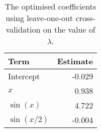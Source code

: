 \begin{table}[!h]

\caption{\label{tab:lasso-coefs}The optimised coefficients using leave-one-out cross-validation on the value of \(\lambda\).}
\centering
\begin{tabular}{lr}
\toprule
Term & Estimate\\
\midrule
Intercept & -0.029\\
\(x\) & 0.938\\
\(\sin(x)\) & 4.722\\
\(\sin(x/2)\) & -0.004\\
\bottomrule
\end{tabular}
\end{table}